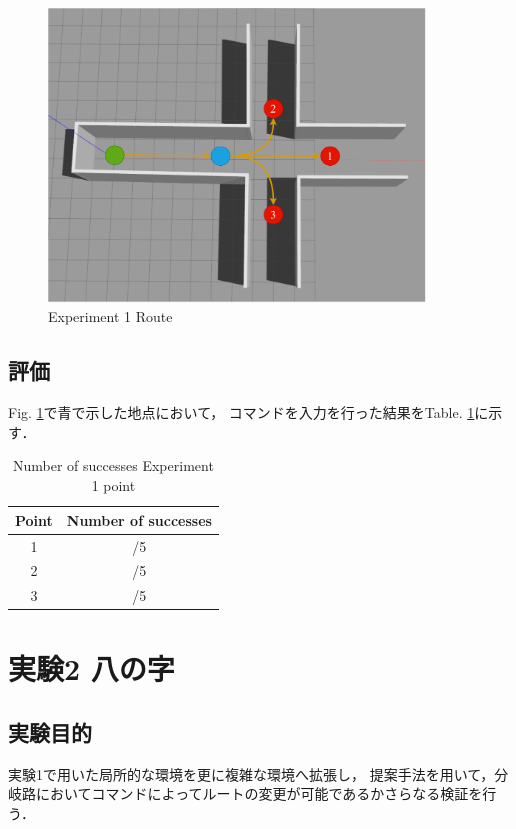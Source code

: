 \begin{figure}[ht]
    \centering
    \includegraphics[width = 10cm]{./figs/zyuziroute.pdf}
    \caption{Experiment 1 Route}
    \label{fig::exp1route}
\end{figure}

\subsection{評価}

Fig. \ref{fig::exp1route}で青で示した地点において，
コマンドを入力を行った結果をTable. \ref{tb::exp1suc}に示す．
\begin{table}[H]
  \centering
  \caption{Number of successes Experiment 1 point}
  \begin{tabular}{|c|c|}
  \hline
  Point & Number of successes \\ \hline
  1     & /5                  \\ \hline
  2     & /5                  \\ \hline
  3     & /5                  \\ \hline
  \end{tabular}
  
  \label{tb::exp1suc}
  \end{table}

\newpage
\section{実験2 八の字}
\subsection{実験目的}
実験1で用いた局所的な環境を更に複雑な環境へ拡張し，
提案手法を用いて，分岐路においてコマンドによってルートの変更が可能であるかさらなる検証を行う．

